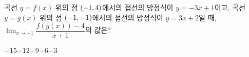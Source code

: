 곡선 $y=f(x)$ 위의 점 $(-1{,}\mkern3mu\mathopen{}4)$에서의 접선의 방정식이 $y=-3x+1$이고, 곡선 $y=g(x)$ 위의 점 $(-1{,}\mkern3mu\mathopen{}-1)$에서의 접선의 방정식이 $y=3x+2$일 때, $\displaystyle\lim_{x\to -1}\dfrac{f(g(x))-4}{x+1}$의 값은?
\begin{choices32}{$-15$}{$-12$}{$-9$}{$-6$}{$-3$}\end{choices32}

